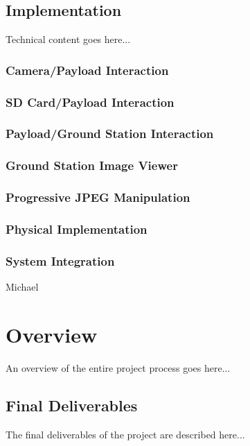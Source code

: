 \documentclass[oneside]{ecsgdp}         %
\begin{document}
\section{Implementation}
Technical content goes here...


\subsection{Camera/Payload Interaction}

\subsection{SD Card/Payload Interaction}

\subsection{Payload/Ground Station Interaction}

\subsection{Ground Station Image Viewer}

\subsection{Progressive JPEG Manipulation}

\subsection{Physical Implementation}


\subsection{System Integration}
Michael

\chapter{Overview}
An overview of the entire project process goes here...

\section{Final Deliverables}
The final deliverables of the project are described here...
\end{document}
